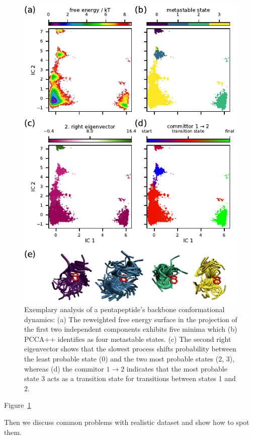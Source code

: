 \documentclass[9pt,tutorial]{livecoms}
\begin{document}
\begin{figure}
\includegraphics{figure_2}
\caption{Exemplary analysis of a pentapeptide's backbone conformational dynamics: (a) The reweighted free energy surface in the projection of the first two independent components exhibits five minima which (b) PCCA++ identifies as four metastable states. (c) The second right eigenvector shows that the slowest process shifts probability between the least probable state (0) and the two most probable states (2, 3), whereas (d) the commitor $1\to2$ indicates that the most probable state 3 acts as a transition state for transitions between states 1 and 2.}
\label{fig:msm-analysis}
\end{figure}

Figure~\ref{fig:msm-analysis}

Then we discuss common problems with realistic dataset and show how to spot them.
\end{document}
